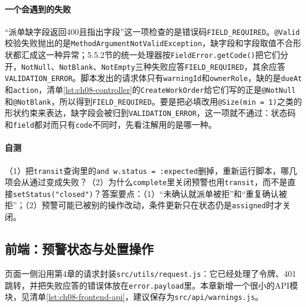 \paragraph{一个会遇到的失败}“派单缺字段返回400且指出字段”这一项检查的是错误码\texttt{FIELD\_REQUIRED}。\texttt{@Valid}校验失败抛出的是\texttt{MethodArgumentNotValidException}，缺字段和字段取值不合形状都汇成这一种异常；5.5.2节的统一处理器按\texttt{FieldError.getCode()}把它们分开，\texttt{NotNull}、\texttt{NotBlank}、\texttt{NotEmpty}三种失败应答\texttt{FIELD\_REQUIRED}，其余应答\texttt{VALIDATION\_ERROR}。脚本发出的请求体只有\texttt{warningId}和\texttt{ownerRole}，缺的是\texttt{dueAt}和\texttt{action}，清单\ref{lst:ch08-controller}的\texttt{CreateWorkOrder}给它们写的正是\texttt{@NotNull}和\texttt{@NotBlank}，所以得到\texttt{FIELD\_REQUIRED}。要是把必填改用\texttt{@Size(min = 1)}之类的形状约束来表达，缺字段会被归到\texttt{VALIDATION\_ERROR}，这一项就不通过：状态码和\texttt{field}都对而只有\texttt{code}不同时，先看注解用的是哪一种。

\paragraph{自测}（1）把\texttt{transit}查询里的\texttt{and w.status = :expected}删掉，重新运行脚本，哪几项会从通过变成失败？（2）为什么\texttt{complete}里关闭预警也用\texttt{transit}，而不是直接\texttt{setStatus("closed")}？答案要点：（1）“未确认就派单被拒”和“重复确认被拒”；（2）预警可能已被别的操作改动，条件更新只在状态仍是\texttt{assigned}时才关闭。

\subsection{前端：预警状态与处置操作}

页面一侧沿用第4章的请求封装\texttt{src/utils/request.js}：它已经处理了令牌、401跳转，并把失败应答的错误体放在\texttt{error.payload}里。本章新增一个很小的API模块，见清单\ref{lst:ch08-frontend-api}，建议保存为\texttt{src/api/warnings.js}。

